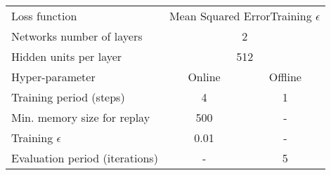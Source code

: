 \begin{table*}
\begin{tabular}{lcc}
Loss function                        & \multicolumn{2}{l}{Mean Squared ErrorTraining $\epsilon$}  \\
Networks number of layers            & \multicolumn{2}{c}{2}                                      \\
Hidden units per layer               & \multicolumn{2}{c}{512}                                    \\
\hline
Hyper-parameter                      & Online & Offline                                           \\
\hline
Training period (steps)              & 4      & 1                                                 \\
Min. memory size for replay          & 500    & -                                                 \\
Training $\epsilon$                  & 0.01   & -                                                 \\
Evaluation period (iterations)       & -      & 5                                                 \\
\bottomrule
\end{tabular}
\end{table*}
